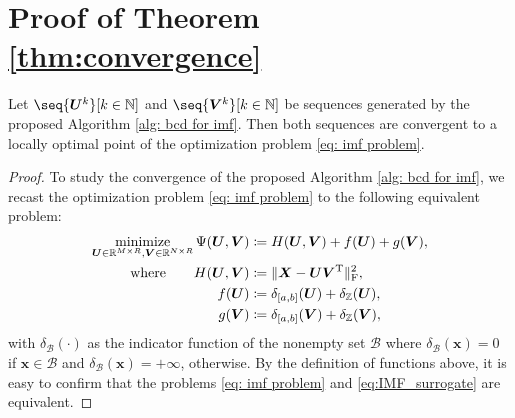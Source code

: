 \section{Proof of Theorem \ref{thm:convergence}} \label{app: proof}

\begin{theorem}
    Let $\seq{\bm U^k}[k\in\N]$ and $\seq{\bm V^k}[k\in\N]$ be sequences generated by the proposed Algorithm \ref{alg: bcd for imf}. Then both sequences are convergent to a locally optimal point of the optimization problem \eqref{eq: imf problem}.
\end{theorem}

\begin{proof}
    To study the convergence of the proposed Algorithm \ref{alg: bcd for imf}, we recast the optimization problem \eqref{eq: imf problem} to the following equivalent problem:
    \begin{align}
        \begin{split}
            \operatorname*{minimize}_{\bm U \in \mathbb{R}^{M\times R}, \bm V \in \mathbb{R}^{N\times R}} \Psi(\bm U, \bm V) &\coloneqq H(\bm U, \bm V) + f(\bm U) + g(\bm V),\\
            \text{where} \quad~~~ H(\bm U, \bm V) &\coloneqq \|\bm X - \bm U \bm V^{\rm T} \|_{\rm F}^2,\\
            f(\bm U) &\coloneqq \delta_{[a,b]}(\bm U) + \delta_\mathbb Z(\bm U),\\
            g(\bm V) &\coloneqq \delta_{[a,b]}(\bm V) + \delta_\mathbb Z(\bm V),
        \end{split}
        \label{eq:IMF_surrogate}
    \end{align}
    with $\delta_\mathcal{B}(\cdot)$ as the indicator function of the nonempty set $\mathcal{B}$ where $\delta_\mathcal{B}(\bm x) = 0$ if $\bm x \in \mathcal{B}$ and $\delta_\mathcal{B}(\bm x) = +\infty$, otherwise. By the definition of functions above, it is easy to confirm that the problems \eqref{eq: imf problem} and \eqref{eq:IMF_surrogate} are equivalent.
    

\end{proof}
